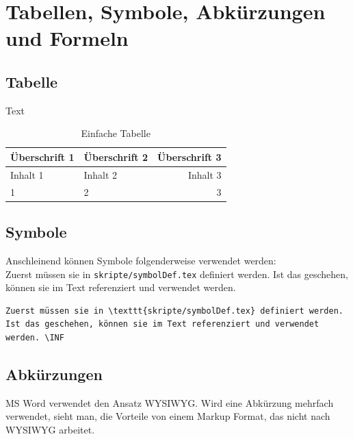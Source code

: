 \newpage
\section{Tabellen, Symbole, Abkürzungen und Formeln}

\subsection{Tabelle}

Text \par

\begin{table}[H]
\caption{Einfache Tabelle}
\begin{center}
\begin{tabularx}{0.7\textwidth}[ht]{|l|X|r|}
    \hline
Überschrift 1 & Überschrift 2 & Überschrift 3 \\ \hline
Inhalt 1 & Inhalt 2 & Inhalt 3 \\ \hline
1 & 2 & 3 \\ \hline
\end{tabularx}
\end{center}
\label{tbl:Beispieltabelle}
\end{table}
\vspace{-3em}
\cite[Quelle:][S. 300]{Beckert.2012}

\subsection{Symbole}

Anschleinend können Symbole folgenderweise verwendet werden: \\
Zuerst müssen sie in \texttt{skripte/symbolDef.tex} definiert werden. Ist das geschehen, können sie im Text referenziert und verwendet werden. \INF

\begin{lstlisting}
Zuerst müssen sie in \texttt{skripte/symbolDef.tex} definiert werden. Ist das geschehen, können sie im Text referenziert und verwendet werden. \INF
\end{lstlisting}

\subsection{Abkürzungen}

\ac{MS} Word verwendet den Ansatz \ac{WYSIWYG}. Wird eine Abkürzung mehrfach verwendet, sieht man, die Vorteile von einem Markup Format, das nicht nach \ac{WYSIWYG} arbeitet.

